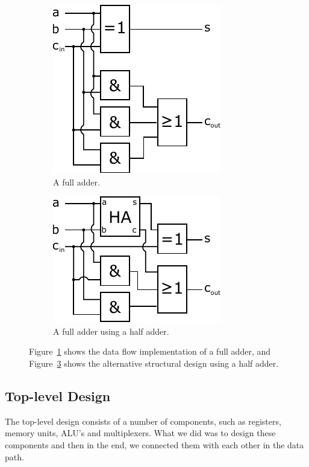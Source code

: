\documentclass[a4,11pt]{article}
\begin{document}
\begin{figure}[h!]
	\centering
 	\begin{subfigure}{.5\textwidth}
		\centering
		\includegraphics[height=.3\textheight]{Figurer/fa}
		\caption{A full adder.}
		\label{fig:fa} 
	\end{subfigure}%
	\begin{subfigure}{.5\textwidth}
		\centering
		\includegraphics[height=.3\textheight]{Figurer/fa2}
		\caption{A full adder using a half adder.}
		\label{fig:fa2} 
  	\end{subfigure}
	\caption{Figure~\ref{fig:fa} shows the data flow implementation of a full adder,
		and Figure~\ref{fig:fa2} shows the alternative structural design using a half adder.}
\end{figure}

\newpage

\subsection{Top-level Design}

The top-level design consists of a number of components, such as registers, memory units, ALU's
and multiplexers. What we did was to design these components and then in the end, we connected
them with each other in the data path.
\end{document}

